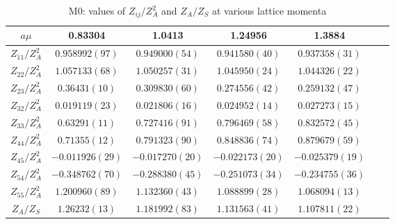 \begin{table}
\begin{center}
\caption{\label{tab:M0renormvals}M0: values of $Z_{ij}/Z_A^2$ and $Z_A/Z_S$ at various lattice momenta}
\begin{tabular}{c|c c c c c c}
\hline
\hline
$a\mu$ & 0.83304 & 1.0413 & 1.24956 & 1.3884 \\
\hline
$Z_{11}/Z_A^2$ & $0.958992(97)$ & $0.949000(54)$ & $0.941580(40)$ & $0.937358(31)$ \\
\hline
$Z_{22}/Z_A^2$ & $1.057133(68)$ & $1.050257(31)$ & $1.045950(24)$ & $1.044326(22)$ \\
$Z_{23}/Z_A^2$ & $0.36431(10)$ & $0.309830(60)$ & $0.274556(42)$ & $0.259132(47)$ \\
$Z_{32}/Z_A^2$ & $0.019119(23)$ & $0.021806(16)$ & $0.024952(14)$ & $0.027273(15)$ \\
$Z_{33}/Z_A^2$ & $0.63291(11)$ & $0.727416(91)$ & $0.796469(58)$ & $0.832572(45)$ \\
\hline
$Z_{44}/Z_A^2$ & $0.71355(12)$ & $0.791323(90)$ & $0.848836(74)$ & $0.879679(59)$ \\
$Z_{45}/Z_A^2$ & $-0.011926(29)$ & $-0.017270(20)$ & $-0.022173(20)$ & $-0.025379(19)$ \\
$Z_{54}/Z_A^2$ & $-0.348762(70)$ & $-0.288380(45)$ & $-0.251073(34)$ & $-0.234755(36)$ \\
$Z_{55}/Z_A^2$ & $1.200960(89)$ & $1.132360(43)$ & $1.088899(28)$ & $1.068094(13)$ \\
\hline
$Z_A/Z_S$ & $1.26232(13)$ & $1.181992(83)$ & $1.131563(41)$ & $1.107811(22)$ \\
\hline
\hline
\end{tabular}
\end{center}
\end{table}